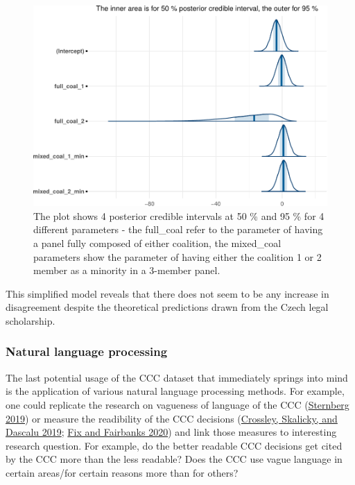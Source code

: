 \documentclass[
  11pt,
]{article}
\begin{document}
\begin{figure}
\centering
\includegraphics{The_Czech_Constitutional_Court_Dataset_files/figure-latex/coalitions-1.pdf}
\caption{The plot shows 4 posterior credible intervals at 50 \% and 95
\% for 4 different parameters - the full\_coal refer to the parameter of
having a panel fully composed of either coalition, the mixed\_coal
parameters show the parameter of having either the coalition 1 or 2
member as a minority in a 3-member panel.}
\end{figure}

This simplified model reveals that there does not seem to be any
increase in disagreement despite the theoretical predictions drawn from
the Czech legal scholarship.

\hypertarget{natural-language-processing}{%
\subsubsection{Natural language
processing}\label{natural-language-processing}}

The last potential usage of the CCC dataset that immediately springs
into mind is the application of various natural language processing
methods. For example, one could replicate the research on vagueness of
language of the CCC
(\protect\hyperlink{ref-sternbergNoPublicNo2019}{Sternberg 2019}) or
measure the readibility of the CCC decisions
(\protect\hyperlink{ref-crossleyMovingClassicReadability2019}{Crossley,
Skalicky, and Dascalu 2019};
\protect\hyperlink{ref-fixEffectOpinionReadability2020}{Fix and
Fairbanks 2020}) and link those measures to interesting research
question. For example, do the better readable CCC decisions get cited by
the CCC more than the less readable? Does the CCC use vague language in
certain areas/for certain reasons more than for others?
\end{document}
